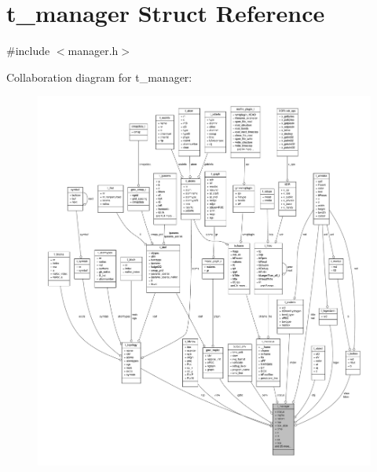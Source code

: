 \hypertarget{structt__manager}{\section{t\-\_\-manager \-Struct \-Reference}
\label{structt__manager}
}


{\ttfamily \#include $<$manager.\-h$>$}



\-Collaboration diagram for t\-\_\-manager\-:
\nopagebreak
\begin{figure}[H]
\begin{center}
\leavevmode
\includegraphics[width=350pt]{structt__manager__coll__graph}
\end{center}
\end{figure}
